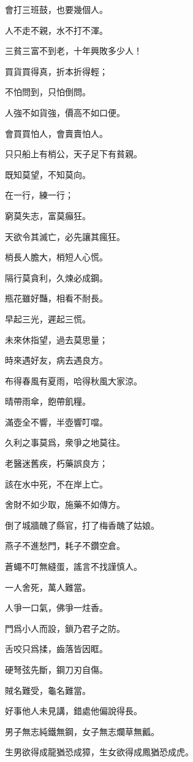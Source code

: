 \documentclass[12pt,a4paper]{ctexbook}
\begin{document}
會打三班鼓，也要幾個人。\par
人不走不親，水不打不渾。\par
三貧三富不到老，十年興敗多少人！\par
買貨買得真，折本折得輕；\par
不怕問到，只怕倒問。\par
人強不如貨強，價高不如口便。\par
會買買怕人，會賣賣怕人。\par
只只船上有梢公，天子足下有貧親。\par
既知莫望，不知莫向。\par
在一行，練一行；\par
窮莫失志，富莫癲狂。\par
天欲令其滅亡，必先讓其瘋狂。\par
梢長人膽大，梢短人心慌。\par
隔行莫貪利，久煉必成鋼。\par
瓶花雖好豔，相看不耐長。\par
早起三光，遲起三慌。\par
未來休指望，過去莫思量；\par
時來遇好友，病去遇良方。\par
布得春風有夏雨，哈得秋風大家涼。\par
晴帶雨傘，飽帶飢糧。\par
滿壺全不響，半壺響叮噹。\par
久利之事莫爲，衆爭之地莫往。\par
老醫迷舊疾，朽藥誤良方；\par
該在水中死，不在岸上亡。\par
舍財不如少取，施藥不如傳方。\par
倒了城牆醜了縣官，打了梅香醜了姑娘。\par
燕子不進愁門，耗子不鑽空倉。\par
蒼蠅不叮無縫蛋，謠言不找謹慎人。\par
一人舍死，萬人難當。\par
人爭一口氣，佛爭一炷香。\par
門爲小人而設，鎖乃君子之防。\par
舌咬只爲揉，齒落皆因眶。\par
硬弩弦先斷，鋼刀刃自傷。\par
賊名難受，龜名難當。\par
好事他人未見講，錯處他偏說得長。\par
男子無志純鐵無鋼，女子無志爛草無瓤。\par
生男欲得成龍猶恐成獐，生女欲得成鳳猶恐成虎。\par
\end{document}
